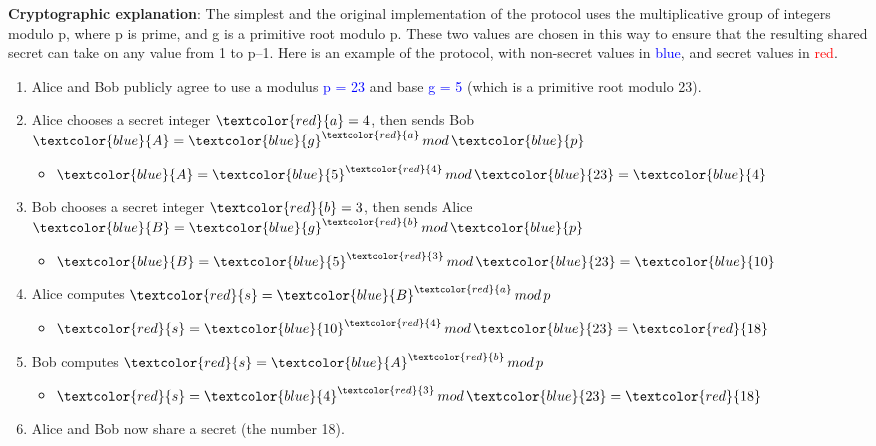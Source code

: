 \textbf{Cryptographic explanation}:
\newline
The simplest and the original implementation of the protocol uses the multiplicative group of integers modulo p,
where p is prime, and g is a primitive root modulo p.
These two values are chosen in this way to ensure that the resulting shared secret can take on any value from 1 to p–1.
Here is an example of the protocol, with non-secret values in \textcolor{blue}{blue}, and secret values in \textcolor{red}{red}.
\newline
\begin{enumerate}
    \item Alice and Bob publicly agree to use a modulus \textcolor{blue}{p = 23} and base \textcolor{blue}{g = 5} (which is a primitive root modulo 23).

    \item Alice chooses a secret integer $\textcolor{red}{a} = 4$, then sends Bob $\textcolor{blue}{A} = \textcolor{blue}{g}^{\textcolor{red}{a}} \, mod  \, \textcolor{blue}{p}$
    \begin{itemize}
        \item $\textcolor{blue}{A} = \textcolor{blue}{5}^{\textcolor{red}{4}} \, mod  \, \textcolor{blue}{23} = \textcolor{blue}{4}$
    \end{itemize}

    \item Bob chooses a secret integer $\textcolor{red}{b} = 3$, then sends Alice $\textcolor{blue}{B} = \textcolor{blue}{g}^{\textcolor{red}{b}} \, mod  \, \textcolor{blue}{p}$
    \begin{itemize}
        \item $\textcolor{blue}{B} = \textcolor{blue}{5}^{\textcolor{red}{3}} \, mod  \, \textcolor{blue}{23} = \textcolor{blue}{10}$
    \end{itemize}

    \item Alice computes $\textcolor{red}{s} = \textcolor{blue}{B}^{\textcolor{red}{a}} \, mod \, p$
    \begin{itemize}
        \item $\textcolor{red}{s} = \textcolor{blue}{10}^{\textcolor{red}{4}} \, mod \, \textcolor{blue}{23} = \textcolor{red}{18}$
    \end{itemize}

    \item Bob computes $\textcolor{red}{s} = \textcolor{blue}{A}^{\textcolor{red}{b}} \, mod \, p$
    \begin{itemize}
        \item $\textcolor{red}{s} = \textcolor{blue}{4}^{\textcolor{red}{3}} \, mod \, \textcolor{blue}{23} = \textcolor{red}{18}$
    \end{itemize}

    \item Alice and Bob now share a secret (the number 18).
\end{enumerate}

